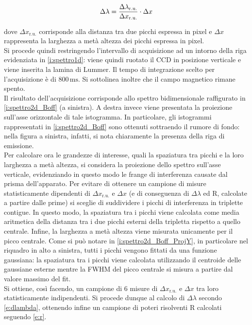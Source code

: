 \documentclass[twocolumn,10pt]{asme2ej}
\begin{document}
\vspace{-15pt}
\begin{equation}
    \Delta\lambda = \frac{\Delta\lambda_{\text{r.u.}}}{\Delta x_{\text{r.u.}}} \cdot \Delta x
    \label{e:dlambda}
\vspace{-5pt}
\end{equation}

dove $\Delta x_{\text{r.u.}}$ corrisponde alla distanza tra due picchi espressa in pixel e $\Delta x$ rappresenta la
larghezza a metà altezza dei picchi espressa in pixel.  \\

Si procede quindi restringendo l'intervallo di acquisizione ad un intorno della riga evidenziata in
\autoref{i:spettro1d}: viene quindi ruotato il CCD in posizione verticale e viene inserita la lamina di Lummer. Il tempo
di integrazione scelto per l'acquisizione è di $800\,\si{\milli\second}$. Si sottolinea inoltre che il campo magnetico
rimane spento. \\
Il risultato dell'acquisizione corrisponde allo spettro bidimensionale raffigurato in \autoref{i:spettro2d_Boff} (a
sinistra). A destra invece viene presentata la proiezione sull'asse orizzontale di tale istogramma. In particolare, gli
istogrammi rappresentati in \autoref{i:spettro2d_Boff} sono ottenuti sottraendo il rumore di fondo: nella figura a
sinistra, infatti, si nota chiaramente la presenza della riga di emissione. \\
Per calcolare ora le grandezze di interesse, quali la spaziatura tra picchi e la loro larghezza a metà altezza, si
considera la proiezione dello spettro sull'asse verticale, evidenziando in questo modo le frange di interferenza causate
dal prisma dell'apparato. Per evitare di ottenere un campione di misure statisticamente dipendenti di $\Delta
x_{\text{r.u.}}$ e $\Delta x$ (e di conseguenza di $\Delta\lambda$ ed R, calcolate a partire dalle prime) si sceglie di
suddividere i picchi di interferenza in triplette contigue. In questo modo, la spaziatura tra i picchi viene calcolata
come media aritmetica della distanza tra i due picchi esterni della tripletta rispetto a quello centrale. Infine, la
larghezza a metà altezza viene misurata unicamente per il picco centrale. Come si può notare in
\autoref{i:spettro2d_Boff_ProjY}, in particolare nel riquadro in alto a sinistra, tutti i picchi vengono fittati da una
funzione gaussiana: la spaziatura tra i picchi viene calcolata utilizzando il centroide delle gaussiane esterne mentre
la FWHM del picco centrale si misura a partire dal valore massimo del fit. \\
Si ottiene, così facendo, un campione di 6 misure di $\Delta x_{\text{r.u.}}$ e $\Delta x$ tra loro statisticamente
indipendenti. Si procede dunque al calcolo di $\Delta\lambda$ secondo \autoref{e:dlambda}, ottenendo infine un campione
di poteri risolventi R calcolati seguendo \autoref{e:r}. 
\end{document}
